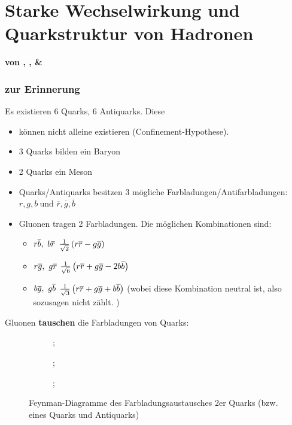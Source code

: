 \documentclass[Ex4_Zusammenfassung.tex]{subfiles}
\begin{document}
\chapter{Starke Wechselwirkung und Quarkstruktur von Hadronen}
\textbf{von \anton, \hein, \martina \& \mitsch}
\subsection{zur Erinnerung}
Es existieren 6 Quarks, 6 Antiquarks. Diese
\begin{itemize}
	\item können nicht alleine existieren (Confinement-Hypothese).
	\item 3 Quarks bilden ein Baryon
	\item 2 Quarks ein Meson
	\item Quarks/Antiquarks besitzen 3 mögliche Farbladungen/Antifarbladungen: $r,g,b\ \text{und } \overline{r}, \overline{g}, \overline{b}$
	\item Gluonen tragen 2 Farbladungen. Die möglichen Kombinationen sind:
		\begin{itemize}
			\item[] $r\overline{b},\ b\overline{r}$ \qquad $\frac{1}{\sqrt{2}}\left(  r\overline{r} - g\overline{g} \right)$
			\item[] $r\overline{g},\ g\overline{r}$ \qquad $\frac{1}{\sqrt{6}}\left(  r\overline{r} + g\overline{g} - 2b\overline{b} \right)$
			\item[] $b\overline{g},\ g\overline{b}$ \qquad $\frac{1}{\sqrt{3}}\left( r\overline{r} + g\overline{g} + b\overline{b}  \right)$ (wobei diese Kombination neutral ist, also sozusagen nicht zählt. )
		\end{itemize}
\end{itemize}
Gluonen \textbf{tauschen} die Farbladungen von Quarks:
\begin{figure}[h]
	\centering
	\begin{subfigure}{0.3\textwidth}
		\centering
			;
	\end{subfigure}
	\quad
	\begin{subfigure}{0.3\textwidth}
		\centering
		;
	\end{subfigure}
	\quad 
	\begin{subfigure}{0.3\textwidth}
		\centering
		;
	\end{subfigure}
	\caption{Feynman-Diagramme des Farbladungsaustausches 2er Quarks (bzw. eines Quarks und Antiquarks)}
\end{figure}
\end{document}
